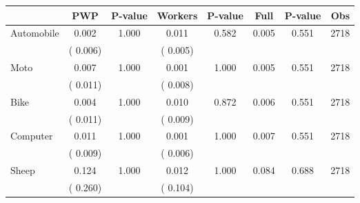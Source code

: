 
\begin{tabular}{l*{7}{c}}\hline&\multicolumn{1}{c}{PWP}&\multicolumn{1}{c}{P-value}&\multicolumn{1}{c}{Workers}&\multicolumn{1}{c}{P-value}&\multicolumn{1}{c}{Full}&\multicolumn{1}{c}{P-value}&\multicolumn{1}{c}{Obs} \\ \hline

 Automobile       &              0.002       &        1.000  &              0.011       &        0.582  &              0.005       &              0.551 &  2718 \\ 
                       &       (       0.006)             &                               &       (       0.005)                     &                               &                                               &                                &                      \\ 

 Moto       &              0.007       &        1.000  &              0.001       &        1.000  &              0.005       &              0.551 &  2718 \\ 
                       &       (       0.011)             &                               &       (       0.008)                     &                               &                                               &                                &                      \\ 

 Bike       &              0.004       &        1.000  &              0.010       &        0.872  &              0.006       &              0.551 &  2718 \\ 
                       &       (       0.011)             &                               &       (       0.009)                     &                               &                                               &                                &                      \\ 

 Computer       &              0.011       &        1.000  &              0.001       &        1.000  &              0.007       &              0.551 &  2718 \\ 
                       &       (       0.009)             &                               &       (       0.006)                     &                               &                                               &                                &                      \\ 

 Sheep       &              0.124       &        1.000  &              0.012       &        1.000  &              0.084       &              0.688 &  2718 \\ 
                       &       (       0.260)             &                               &       (       0.104)                     &                               &                                               &                                &                      \\ 


\end{tabular}
